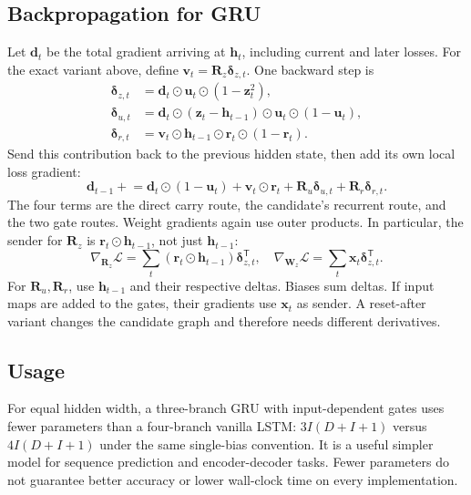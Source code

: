 \documentclass[11pt, oneside]{book}
\newcommand{\T}{^{\mathsf{T}}}           %
\newcommand{\loss}{\mathcal{L}}          %
\newcommand{\params}{\boldsymbol{\theta}}   %
\let\originalsubsection\subsection
\renewcommand{\subsection}{\Needspace{6\baselineskip}\originalsubsection}
\begin{document}
\subsection{Backpropagation for GRU}\label{sec:source-3-8-1}
Let $\mathbf{d}_t$ be the total gradient arriving at $\mathbf{h}_t$, including current and later losses. For the exact variant above, define $\mathbf{v}_t=\mathbf{R}_z\boldsymbol{\delta}_{z,t}$. One backward step is
\begin{align*}
 \boldsymbol{\delta}_{z,t}&=\mathbf{d}_t\odot\mathbf{u}_t\odot(1-\mathbf{z}_t^2),\\
 \boldsymbol{\delta}_{u,t}&=\mathbf{d}_t\odot(\mathbf{z}_t-\mathbf{h}_{t-1})
                   \odot\mathbf{u}_t\odot(1-\mathbf{u}_t),\\
 \boldsymbol{\delta}_{r,t}&=\mathbf{v}_t\odot\mathbf{h}_{t-1}
                   \odot\mathbf{r}_t\odot(1-\mathbf{r}_t).
\end{align*}
Send this contribution back to the previous hidden state, then add its own local loss gradient:
\[
 \mathbf{d}_{t-1}\mathrel{+}=
   \mathbf{d}_t\odot(1-\mathbf{u}_t)
   +\mathbf{v}_t\odot\mathbf{r}_t
   +\mathbf{R}_u\boldsymbol{\delta}_{u,t}
   +\mathbf{R}_r\boldsymbol{\delta}_{r,t}.
\]
The four terms are the direct carry route, the candidate's recurrent route, and the two gate routes. Weight gradients again use outer products. In particular, the sender for $\mathbf{R}_z$ is $\mathbf{r}_t\odot\mathbf{h}_{t-1}$, not just $\mathbf{h}_{t-1}$:
\[
 \nabla_{\mathbf{R}_z}\loss=\sum_t(\mathbf{r}_t\odot\mathbf{h}_{t-1})\boldsymbol{\delta}_{z,t}\T,
 \quad
 \nabla_{\mathbf{W}_z}\loss=\sum_t\mathbf{x}_t\boldsymbol{\delta}_{z,t}\T.
\]
For $\mathbf{R}_u,\mathbf{R}_r$, use $\mathbf{h}_{t-1}$ and their respective deltas. Biases sum deltas. If input maps are added to the gates, their gradients use $\mathbf{x}_t$ as sender. A reset-after variant changes the candidate graph and therefore needs different derivatives.

\subsection{Usage}\label{sec:source-3-8-2}
For equal hidden width, a three-branch GRU with input-dependent gates uses fewer parameters than a four-branch vanilla LSTM: $3I(D+I+1)$ versus $4I(D+I+1)$ under the same single-bias convention. It is a useful simpler model for sequence prediction and encoder-decoder tasks. Fewer parameters do not guarantee better accuracy or lower wall-clock time on every implementation.
\end{document}
